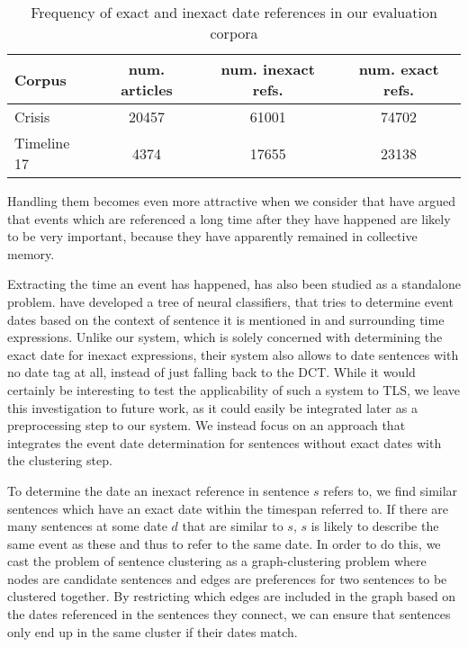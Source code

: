 \documentclass[a4paper,BCOR=10mm]{report}
\numberwithin{lemma}{chapter}
\numberwithin{definition}{chapter}
\begin{document}
\begin{table}
\begin{center}
\begin{tabular}{|l|c|c|c|}
\hline
\textbf{Corpus} & \textbf{num. articles} & \textbf{num. inexact refs.} & \textbf{num. exact refs.} \\\hline
Crisis & 20457 & 61001 & 74702 \\
Timeline 17 & 4374 & 17655 & 23138 \\\hline
\end{tabular}
\caption{Frequency of exact and inexact date references in our evaluation corpora}
\label{tab:ambigous-date-ref}
\end{center}
\end{table}


Handling them becomes even more attractive when we consider that \citet{datesel-graph} have argued that events which are referenced a long time after they have happened are likely to be very important, because they have apparently remained in collective memory. %

Extracting the time an event has happened, has also been studied as a standalone problem. \citet{event-time-extraction} have developed a tree of neural classifiers, that tries to determine event dates based on the context of sentence it is mentioned in and surrounding time expressions. Unlike our system, which is solely concerned with determining the exact date for inexact expressions, their system also allows to date sentences with no date tag at all, instead of just falling back to the DCT.
While it would certainly be interesting to test the applicability of such a system to TLS, we leave this investigation to future work, as it could easily be integrated later as a preprocessing step to our system.
We instead focus on an approach that integrates the event date determination for sentences without exact dates with the clustering step.

To determine the date an inexact reference in sentence $s$ refers to, we find similar sentences which have an exact date within the timespan referred to. If there are many sentences at some date $d$ that are similar to $s$, $s$ is likely to describe the same event as these and thus to refer to the same date. In order to do this, we cast the problem of sentence clustering as a graph-clustering problem where nodes are candidate sentences and edges are preferences for two sentences to be clustered together. By restricting which edges are included in the graph based on the dates referenced in the sentences they connect, we can ensure that sentences only end up in the same cluster if their dates match.
\end{document}
